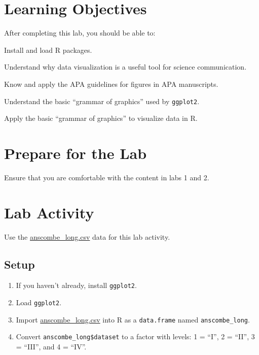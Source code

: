\documentclass[
]{book}
\providecommand{\tightlist}{%
  \setlength{\itemsep}{0pt}\setlength{\parskip}{0pt}}
\begin{document}
\hypertarget{learning-objectives-2}{%
\section{Learning Objectives}\label{learning-objectives-2}}

After completing this lab, you should be able to:

Install and load R packages.

Understand why data visualization is a useful tool for science communication.

Know and apply the APA guidelines for figures in APA manuscripts.

Understand the basic ``grammar of graphics'' used by \texttt{ggplot2}.

Apply the basic ``grammar of graphics'' to visualize data in R.

\hypertarget{prepare-for-the-lab-2}{%
\section{Prepare for the Lab}\label{prepare-for-the-lab-2}}

Ensure that you are comfortable with the content in labs 1 and 2.

\hypertarget{lab-activity-2}{%
\section{Lab Activity}\label{lab-activity-2}}

Use the \href{assets/data/anscombe_long.csv}{anscombe\_long.csv} data for this lab activity.

\hypertarget{setup}{%
\subsection{Setup}\label{setup}}

\begin{enumerate}
\def\labelenumi{\arabic{enumi}.}
\tightlist
\item
  If you haven't already, install \texttt{ggplot2}.
\item
  Load \texttt{ggplot2}.
\item
  Import \href{assets/data/anscombe_long.csv}{anscombe\_long.csv} into R as a \texttt{data.frame} named \texttt{anscombe\_long}.
\item
  Convert \texttt{anscombe\_long\$dataset} to a factor with levels: 1 = ``I'', 2 = ``II'', 3 = ``III'', and 4 = ``IV''.
\end{enumerate}
\end{document}
